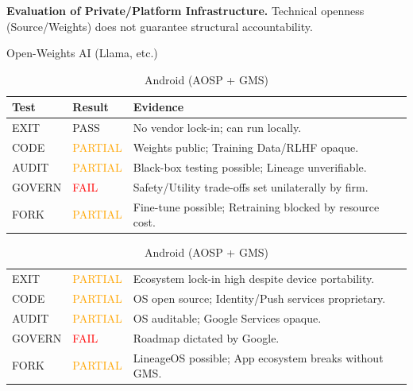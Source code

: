 \documentclass{article}
\begin{document}
\begin{table}[htbp]
    \centering
    \caption{\textbf{Evaluation of Private/Platform Infrastructure.} Technical openness (Source/Weights) does not guarantee structural accountability.}
    \label{tab:corp_infra}

    \begin{subtable}{1\textwidth}
        \centering
        \caption{Open-Weights AI (Llama, etc.)}
        \small
        \begin{tabular}{@{}llp{8.5cm}@{}}
            \toprule
            \textbf{Test} & \textbf{Result} & \textbf{Evidence} \\
            \midrule
            EXIT & \textcolor{green!50!black}{PASS} & No vendor lock-in; can run locally. \\
            CODE & \textcolor{orange}{PARTIAL} & Weights public; Training Data/RLHF opaque. \\
            AUDIT & \textcolor{orange}{PARTIAL} & Black-box testing possible; Lineage unverifiable. \\
            GOVERN & \textcolor{red}{FAIL} & Safety/Utility trade-offs set unilaterally by firm. \\
            FORK & \textcolor{orange}{PARTIAL} & Fine-tune possible; Retraining blocked by resource cost. \\
            \bottomrule
        \end{tabular}
        \vspace{0.3cm}
    \end{subtable}

    \begin{subtable}{1\textwidth}
        \centering
        \caption{Android (AOSP + GMS)}
        \small
        \begin{tabular}{@{}llp{8.5cm}@{}}
            \toprule
            EXIT & \textcolor{orange}{PARTIAL} & Ecosystem lock-in high despite device portability. \\
            CODE & \textcolor{orange}{PARTIAL} & OS open source; Identity/Push services proprietary. \\
            AUDIT & \textcolor{orange}{PARTIAL} & OS auditable; Google Services opaque. \\
            GOVERN & \textcolor{red}{FAIL} & Roadmap dictated by Google. \\
            FORK & \textcolor{orange}{PARTIAL} & LineageOS possible; App ecosystem breaks without GMS. \\
            \bottomrule
        \end{tabular}
        \vspace{0.3cm}
    \end{subtable}


\end{table}
\end{document}
